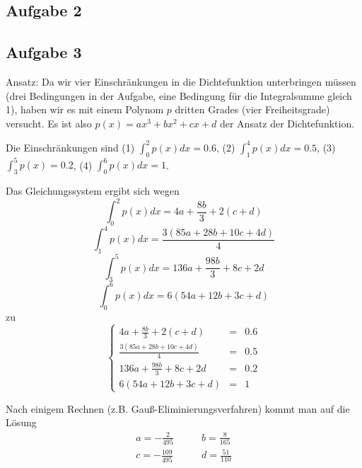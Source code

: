 \documentclass[11pt,a4paper,ngerman]{article}
\begin{document}
\subsection*{Aufgabe 2}
\subsection*{Aufgabe 3}
Ansatz: Da wir vier Einschränkungen in die Dichtefunktion unterbringen müssen (drei Bedingungen in der Aufgabe, eine Bedingung für die Integralsumme gleich 1), haben
wir es mit einem Polynom $p$ dritten Grades (vier Freiheitsgrade) versucht. Es ist also $p(x) = ax^3 + bx^2 + cx +d$ der Ansatz der Dichtefunktion.

Die Einschränkungen sind (1) $\int_0^2 p(x) dx = 0.6$, (2) $\int_1^4 p(x) dx = 0.5$, (3) $\int_3^5 p(x) = 0.2$, (4) $\int_0^6 p(x) dx = 1$.

Das Gleichungssystem ergibt sich wegen
\begin{equation}
\int_0^2 p(x) dx = 4 a + \frac{8b}{3} + 2 (c + d)
\end{equation}
\begin{equation}
\int_1^4 p(x) dx =\frac{3 (85 a + 28 b + 10 c + 4 d)}{4}
\end{equation}
\begin{equation}
\int_3^5 p(x) dx =136 a + \frac{98 b}{3} + 8 c + 2 d
\end{equation}
\begin{equation}
\int_0^6 p(x) dx =6 (54 a + 12 b + 3 c + d)
\end{equation}
zu
\begin{equation*}
\left\{
\begin{array}{rcl}
 4 a + \frac{8b}{3} + 2 (c + d) & = & 0.6 \\
\frac{3 (85 a + 28 b + 10 c + 4 d)}{4} & = & 0.5 \\
136 a + \frac{98 b}{3} + 8 c + 2 d &= & 0.2 \\
6 (54 a + 12 b + 3 c + d) &=& 1
\end{array}
\right.
\end{equation*}

Nach einigem Rechnen (z.B. Gauß-Eliminierungsverfahren) kommt man auf die Lösung\\
\begin{equation*}\begin{split}
a = -\frac{2}{495} & \qquad b = \frac{8}{165} \\
c = -\frac{109}{495} & \qquad d = \frac{51}{110}
\end{split}\end{equation*}
\end{document}

